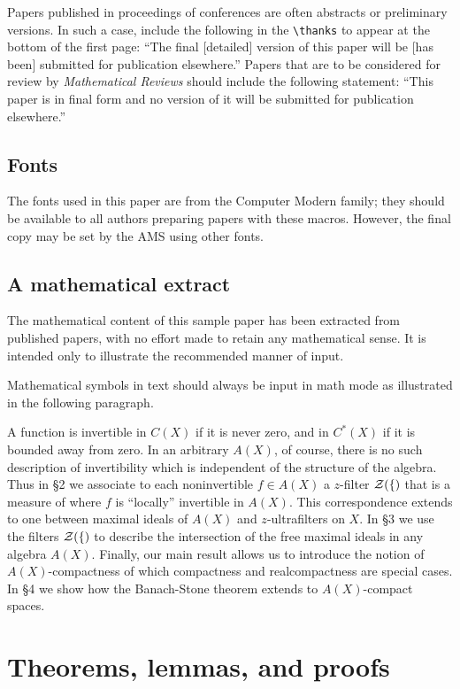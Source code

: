 Papers published in proceedings of conferences are often abstracts or
preliminary versions.  In such a case, include the following in the
\verb+\thanks+ to appear at the bottom of the first page: ``The final
[detailed] version of this paper will be [has been] submitted for
publication elsewhere.''  Papers that are to be considered for review
by {\it Mathematical Reviews\/} should include the following statement:
``This paper is in final form and no version of it will be submitted
for publication elsewhere.''

\subsection{Fonts}
The fonts used in this paper are from the Computer Modern family; they
should be available to all authors preparing papers with these macros.
However, the final copy may be set by the AMS using other fonts.  

\subsection{A mathematical extract}
The mathematical content of this sample paper has been extracted from
published papers, with no effort made to retain any mathematical sense.
It is intended only to illustrate the recommended manner of input.

Mathematical symbols in text should always be input in math mode as
illustrated in the following paragraph.

A function is invertible in $C(X)$ if it is never zero, and in $C^*(X)$ if
it is bounded away from zero. In an arbitrary $A(X)$, of course, there
is no such description of invertibility which is independent of the 
structure of the algebra. Thus in \S 2 we associate to each noninvertible
$f\in A(X)$ a $z$-filter $\cal Z (f)$ that is a measure of where
$f$ is ``locally'' invertible in $A(X)$. This correspondence extends to
one between maximal ideals of $A(X)$ and $z$-ultrafilters on $X$.
In \S 3 we use the filters $\cal Z (f)$ to describe the intersection of 
the free maximal ideals in any algebra $A(X)$. Finally, our main result
allows us to introduce the notion of $A(X)$-compactness of which 
compactness and realcompactness are special cases. In \S 4 we show how
the Banach-Stone theorem extends to $A(X)$-compact spaces.

\section{Theorems, lemmas, and proofs}

